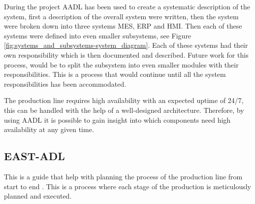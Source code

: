 During the project AADL has been used to create a systematic description of the system, first a description of the overall system were written, then the system were broken down into three systems MES, ERP and HMI. Then each of these systems were defined into even smaller subsystems, see Figure \ref{fig:systems_and_subsystems-system_diagram}. Each of these systems had their own responsibility which is then documented and described. Future work for this process, would be to split the subsystem into even smaller modules with their responsibilities. This is a process that would continue until all the system responsibilities has been accommodated.



The production line requires high availability with an expected uptime of 24/7, this can be handled with the help of a well-designed architecture. Therefore, by using AADL it is possible to gain insight into which components need high availability at any given time.


\subsection{EAST-ADL}
This is a guide that help with planning the process of the production line from start to end \cite{eastadl_whitepaper}. This is a process where each stage of the production is meticulously planned and executed.

